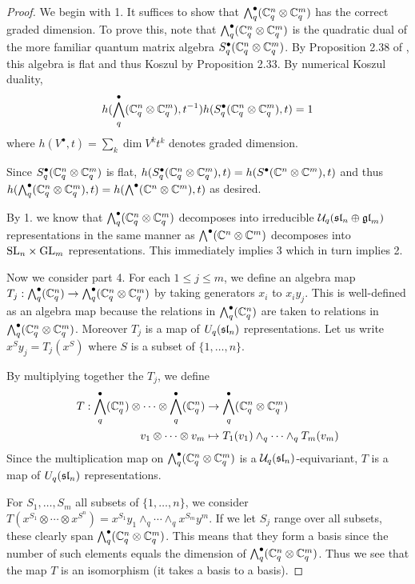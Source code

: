 \documentclass[10pt,leqno]{article}
\begin{document}
\begin{proof}
We begin with 1. It suffices to show that $ \Alt^\bullet_q(\bC_q^n \otimes \bC_q^m) $   has the correct graded dimension.  To prove this, note that $\Alt^\bullet_q(\bC_q^n \otimes \bC_q^m) $ is the quadratic dual of the more familiar quantum matrix algebra $ S_q^\bullet (\bC_q^n \otimes \bC_q^m) $.  By Proposition 2.38 of \cite{BW}, this algebra is flat and thus Koszul by Proposition 2.33.  By numerical Koszul duality,
    $$ h(\Alt^\bullet_q( \bC_q^n \otimes \bC_q^m), t^{-1}) h(S^\bullet_q (\bC_q^n \otimes \bC_q^m), t) = 1 $$ 
    where $ h(V^\bullet, t) = \sum_k \dim V^k t^k $ denotes graded dimension.
    
    Since $ S^\bullet_q (\bC_q^n \otimes \bC_q^m) $ is flat, $ h(S^\bullet_q (\bC_q^n \otimes \bC_q^m), t) =  h(S^\bullet (\bC^n \otimes \bC^m), t) $ and thus  $ h(\Alt^\bullet_q (\bC_q^n \otimes \bC_q^m), t) =  h(\Alt^\bullet (\bC^n \otimes \bC^m), t)$ as desired.
    
By 1. we know that $ \Alt^\bullet_q(\bC_q^n \otimes \bC_q^m) $ decomposes into irreducible $ \Uq(\sl_n \oplus \gl_m) $ representations in the same manner as $ \Alt^\bullet(\bC^n \otimes \bC^m) $ decomposes into $ \SL_n \times \GL_m $ representations.  This immediately implies 3 which in turn implies 2.

Now we consider part 4.  For each $ 1 \le j \le m$, we define an algebra map
$T_j : \Alt^\bullet_q(\bC_q^n) \rightarrow \Alt^\bullet_q (\bC_q^n \otimes \bC_q^m) $ by taking generators $ x_i $ to $ x_i y_j$.  This is well-defined as an algebra map because the relations in $ \Alt^\bullet_q(\bC_q^n) $ are taken to relations in $\Alt^\bullet_q (\bC_q^n \otimes \bC_q^m)$.  Moreover $T_j $ is a map of $ U_q(\sl_n) $ representations.   Let us write $ x^S y_j = T_j(x^S) $ where $ S $ is a subset of $ \{ 1, \dots, n \} $.

By multiplying together the $ T_j $, we define
\begin{align*}
T : \Alt^\bullet_q(\bC_q^n) \otimes \cdots \otimes \Alt^\bullet_q(\bC_q^n) &\rightarrow \Alt_q^\bullet (\bC_q^n \otimes \bC_q^m) \\
v_1 \otimes \cdots \otimes v_m &\mapsto T_1(v_1) \wedge_q \cdots \wedge_q T_m(v_m)
\end{align*}
Since the multiplication map on $\Alt_q^\bullet (\bC_q^n \otimes \bC_q^m)  $ is a $\Uq(\sl_n)$-equivariant, $ T $ is a map of $ U_q(\sl_n) $ representations.

For $ S_1, \dots, S_m $ all subsets of $ \{1, \dots, n \} $, we consider $ T(x^{S_1} \otimes \cdots \otimes x^{S^n}) = x^{S_1} y_1 \wedge_q \cdots \wedge_q x^{S_m}y^m $.  If we let $ S_j $ range over all subsets, these clearly span $ \Alt_q^\bullet (\bC_q^n \otimes \bC_q^m) $.  This means that they form a basis since the number of such elements equals the dimension of $ \Alt_q^\bullet (\bC_q^n \otimes \bC_q^m) $.  Thus we see that the map $ T $ is an isomorphism (it takes a basis to a basis).
\end{proof}
\end{document}
